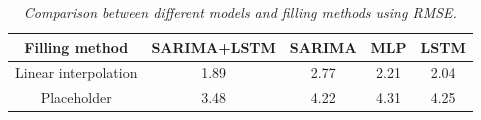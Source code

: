\begin{table}[H]
 \begin{tabular}{|c|c|c|c|c|} 
 \hline
 Filling method & SARIMA+LSTM & SARIMA & MLP & LSTM \\
 \hline \hline
 Linear interpolation & 1.89 & 2.77 & 2.21 & 2.04\\
 Placeholder & 3.48 & 4.22 & 4.31 & 4.25\\
 \hline
 \end{tabular}
 \caption{\textit{Comparison between different models and filling methods using RMSE.}}
 \label{table:RMSE}
\end{table}








